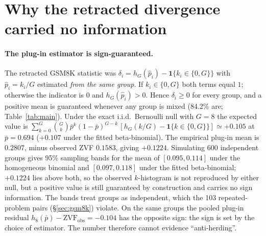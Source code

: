 \documentclass[11pt]{article}
\begin{document}
\section{Why the retracted divergence carried no information}

\paragraph{The plug-in estimator is sign-guaranteed.}
The retracted GSM8K statistic was
$\delta_i = h_G(\hat p_i)-\mathbf{1}\{k_i\in\{0,G\}\}$ with $\hat p_i=k_i/G$
estimated \emph{from the same group}. If $k_i\in\{0,G\}$ both terms equal $1$;
otherwise the indicator is $0$ and $h_G(\hat p_i)>0$. Hence $\delta_i\ge0$ for
every group, and a positive mean is guaranteed whenever any group is mixed
(84.2\% are; Table~\ref{tab:main}). Under the exact i.i.d.\ Bernoulli null
with $G=8$ the expected value is
$\sum_{k=0}^G \binom{G}{k}\bar p^k(1-\bar p)^{G-k}\,[h_G(k/G)-\mathbf{1}\{k\in\{0,G\}\}]
\simeq+0.105$ at $\bar p=0.694$ ($+0.107$ under the fitted beta-binomial).
The empirical plug-in mean is $0.2807$, minus observed ZVF $0.1583$, giving
$+0.1224$. Simulating 600 independent groups gives 95\% sampling bands for the
mean of $[0.095,0.114]$ under the homogeneous binomial and $[0.097,0.118]$
under the fitted beta-binomial; $+0.1224$ lies above both, so the observed
$k$-histogram is not reproduced by either null, but a positive value is still
guaranteed by construction and carries no sign information. The bands treat
groups as independent, which the 103 repeated-problem pairs
(\S\ref{sec:gsm8k}) violate. On the same groups the pooled plug-in residual
$h_8(\bar p)-\mathrm{ZVF}_{\mathrm{obs}}=-0.104$ has the opposite sign: the sign
is set by the choice of estimator. The number therefore cannot evidence
``anti-herding''.
\end{document}
